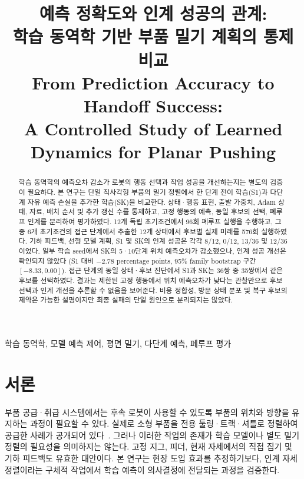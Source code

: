 \documentclass[conference,a4paper]{IEEEtran}
\begin{document}
\title{예측 정확도와 인계 성공의 관계:\\학습 동역학 기반 부품 밀기 계획의 통제 비교\\
\large From Prediction Accuracy to Handoff Success:\\A Controlled Study of Learned Dynamics for Planar Pushing}
\author{}
\maketitle

\begin{abstract}
학습 동역학의 예측오차 감소가 로봇의 행동 선택과 작업 성공을 개선하는지는 별도의 검증이 필요하다.
본 연구는 단일 직사각형 부품의 밀기 정렬에서 한 단계 전이 학습(S1)과 다단계 자유 예측 손실을 추가한 학습(SK)을 비교한다.
상태·행동 표현, 출발 가중치, Adam 상태, 자료, 배치 순서 및 추가 갱신 수를 통제하고, 고정 행동의 예측, 동일 후보의 선택, 폐루프 인계를 분리하여 평가하였다.
12개 독립 초기조건에서 96회 폐루프 실행을 수행하고, 그중 6개 초기조건의 접근 단계에서 추출한 12개 상태에서 후보별 실제 미래를 576회 실행하였다.
기하 피드백, 선형 모델 계획, S1 및 SK의 인계 성공은 각각 8/12, 0/12, 13/36 및 12/36이었다.
일부 학습 seed에서 SK의 5·10단계 위치 예측오차가 감소했으나, 인계 성공 개선은 확인되지 않았다
(S1 대비 $-2.78$ percentage points, 95\% family bootstrap 구간 $[-8.33,0.00]$).
접근 단계의 동일 상태·후보 진단에서 S1과 SK는 36쌍 중 35쌍에서 같은 후보를 선택하였다.
결과는 제한된 고정 행동에서 위치 예측오차가 낮다는 관찰만으로 후보 선택과 인계 개선을 추론할 수 없음을 보여준다.
비용 정합성, 방문 상태 분포 및 복구 후보의 제약은 가능한 설명이지만 최종 실패의 단일 원인으로 분리되지는 않았다.
\end{abstract}
\begin{IEEEkeywords}
학습 동역학, 모델 예측 제어, 평면 밀기, 다단계 예측, 폐루프 평가
\end{IEEEkeywords}

\section{서론}\label{sec:intro}
부품 공급·취급 시스템에서는 후속 로봇이 사용할 수 있도록 부품의 위치와 방향을 유지하는 과정이 필요할 수 있다.
실제로 소형 부품을 전용 툴링·트랙·셔틀로 정렬하여 공급한 사례가 공개되어 있다~\cite{fortville2022}.
그러나 이러한 작업의 존재가 학습 모델이나 별도 밀기 정렬의 필요성을 의미하지는 않는다.
고정 지그, 피더, 현재 자세에서의 직접 집기 및 기하 피드백도 유효한 대안이다.
본 연구는 현장 도입 효과를 추정하기보다, 인계 자세 정렬이라는 구체적 작업에서 학습 예측이 의사결정에 전달되는 과정을 검증한다.
\end{document}
